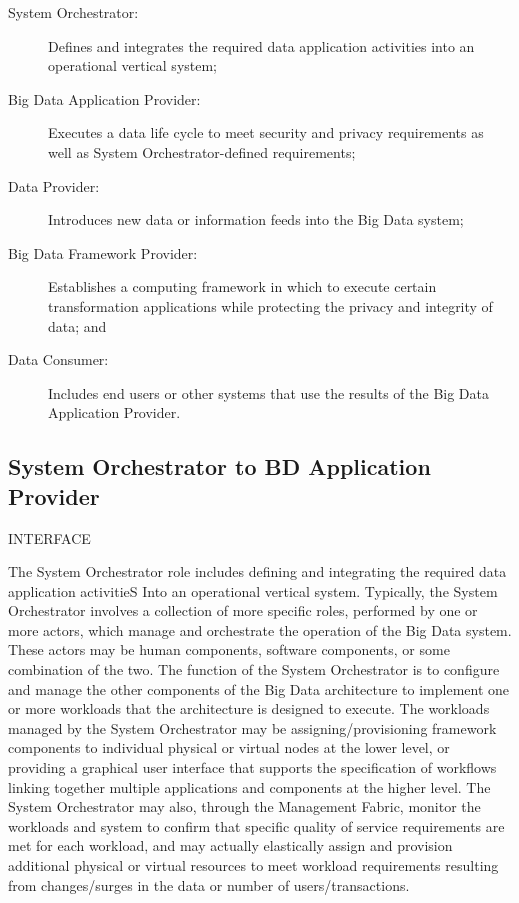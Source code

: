 \documentclass[11pt]{article}
\begin{document}
\begin{description}

\item [System Orchestrator:] Defines and integrates the required data
  application activities into an operational vertical system;

\item [Big Data Application Provider:] Executes a data life cycle to
  meet security and privacy requirements as well as System
  Orchestrator-defined requirements;

\item [Data Provider:] Introduces new data or information feeds into
  the Big Data system;

\item [Big Data Framework Provider:] Establishes a computing framework
  in which to execute certain transformation applications while
  protecting the privacy and integrity of data; and

\item [Data Consumer:] Includes end users or other systems that use
  the results of the Big Data Application Provider.

\end{description}



\subsection{System Orchestrator to BD Application Provider }

INTERFACE

The System Orchestrator role includes defining and integrating the required data application activitieS 
Into an operational vertical system. Typically, the System Orchestrator involves a collection of more 
specific roles, performed by one or more actors, which manage and orchestrate the operation of the Big 
Data system. These actors may be human components, software components, or some combination of the 
two. The function of the System Orchestrator is to configure and manage the other components of the Big 
Data architecture to implement one or more workloads that the architecture is designed to execute. The 
workloads managed by the System Orchestrator may be assigning/provisioning framework components to 
individual physical or virtual nodes at the lower level, or providing a graphical user interface that supports 
the specification of workflows linking together multiple applications and components at the higher level. 
The System Orchestrator may also, through the Management Fabric, monitor the workloads and system to 
confirm that specific quality of service requirements are met for each workload, and may actually 
elastically assign and provision additional physical or virtual resources to meet workload requirements 
resulting from changes/surges in the data or number of users/transactions.
\end{document}
